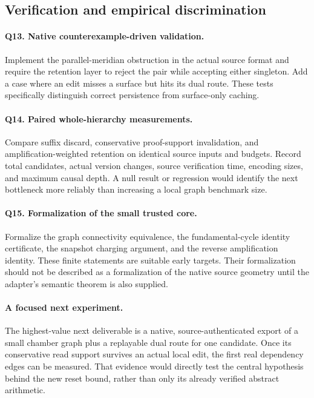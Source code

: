 \documentclass[11pt]{article}
\theoremstyle{definition}
\begin{document}
\subsection{Verification and empirical discrimination}
\paragraph{Q13. Native counterexample-driven validation.}
Implement the parallel-meridian obstruction in the actual source format and require the retention layer to reject the pair while accepting either singleton. Add a case where an edit misses a surface but hits its dual route. These tests specifically distinguish correct persistence from surface-only caching.

\paragraph{Q14. Paired whole-hierarchy measurements.}
Compare suffix discard, conservative proof-support invalidation, and amplification-weighted retention on identical source inputs and budgets. Record total candidates, actual version changes, source verification time, encoding sizes, and maximum causal depth. A null result or regression would identify the next bottleneck more reliably than increasing a local graph benchmark size.

\paragraph{Q15. Formalization of the small trusted core.}
Formalize the graph connectivity equivalence, the fundamental-cycle identity certificate, the snapshot charging argument, and the reverse amplification identity. These finite statements are suitable early targets. Their formalization should not be described as a formalization of the native source geometry until the adapter's semantic theorem is also supplied.

\paragraph{A focused next experiment.}
The highest-value next deliverable is a native, source-authenticated export of a small chamber graph plus a replayable dual route for one candidate. Once its conservative read support survives an actual local edit, the first real dependency edges can be measured. That evidence would directly test the central hypothesis behind the new reset bound, rather than only its already verified abstract arithmetic.
\end{document}
